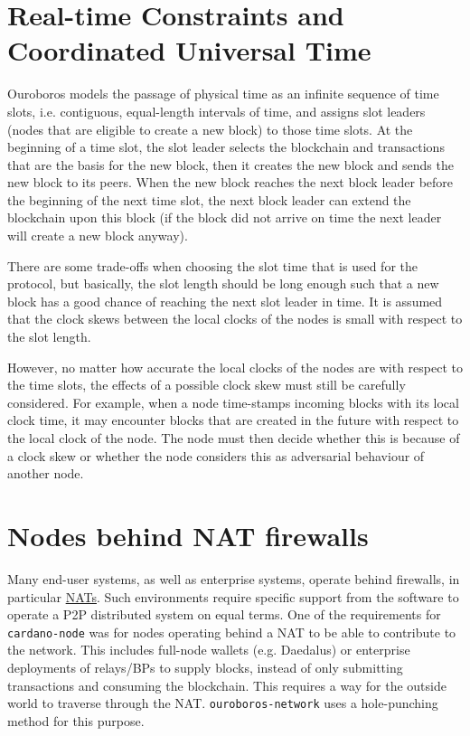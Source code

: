 \section{Real-time Constraints and Coordinated Universal Time}
Ouroboros models the passage of physical time as an infinite sequence of time
slots, i.e. contiguous, equal-length intervals of time, and assigns slot
leaders (nodes that are eligible to create a new block) to those time slots.
At the beginning of a time slot, the slot leader selects the blockchain and
transactions that are the basis for the new block, then it creates the new
block and sends the new block to its peers.  When the new block reaches the
next block leader before the beginning of the next time slot, the next block leader
can extend the blockchain upon this block (if the block did not arrive on time
the next leader will create a new block anyway).

There are some trade-offs when choosing the slot time that is used for the
protocol, but basically, the slot length should be long enough such that a new
block has a good chance of reaching the next slot leader in time.  It is assumed
that the clock skews between the local clocks of the nodes is small with
respect to the slot length.

However, no matter how accurate the local clocks of the nodes are with respect
to the time slots, the effects of a possible clock skew must still be carefully
considered.  For example, when a node time-stamps incoming blocks with its
local clock time, it may encounter blocks that are created in the future with
respect to the local clock of the node.  The node must then decide whether this
is because of a clock skew or whether the node considers this as adversarial
behaviour of another node.

\section{Nodes behind NAT firewalls}

Many end-user systems, as well as enterprise systems, operate behind firewalls,
in particular
\href{https://en.wikipedia.org/wiki/Network_address_translation}{NATs}.  Such
environments require specific support from the software to operate
a P2P distributed system on equal terms. One of the requirements for
\texttt{cardano-node} was for nodes operating behind a NAT to be able to
contribute to the network. This includes full-node wallets (e.g. Daedalus) or
enterprise deployments of relays/BPs to supply blocks, instead of only
submitting transactions and consuming the blockchain.  This requires a way for
the outside world to traverse through the NAT. \texttt{ouroboros-network} uses
a hole-punching method for this purpose.

